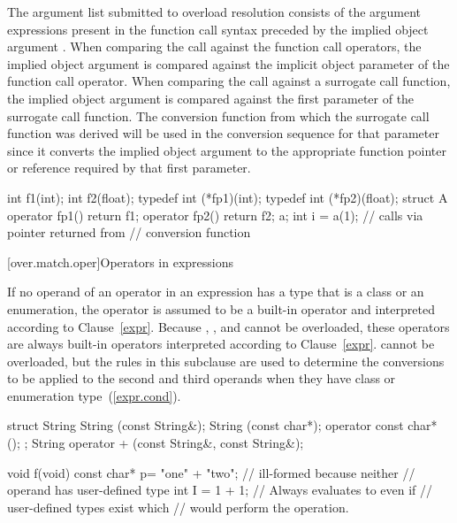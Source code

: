 \pnum
The argument list submitted to overload resolution consists of
the argument expressions present in the function call syntax
preceded by the implied object argument
.
\enternote
When comparing the
call against the function call operators, the implied object
argument is compared against the implicit object parameter of the
function call operator.
When comparing the call against a
surrogate call function, the implied object argument is compared
against the first parameter of the surrogate call function.
The
conversion function from which the surrogate call function was
derived will be used in the conversion sequence for that
parameter since it converts the implied object argument to the
appropriate function pointer or reference required by that first
parameter.
\exitnote
\enterexample

\begin{codeblock}
int f1(int);
int f2(float);
typedef int (*fp1)(int);
typedef int (*fp2)(float);
struct A {
  operator fp1() { return f1; }
  operator fp2() { return f2; }
} a;
int i = a(1);       // calls  via pointer returned from
                    // conversion function
\end{codeblock}
\exitexample%

[over.match.oper]{Operators in expressions}%

\pnum
If no operand of an operator in an expression has a type that is a class
or an enumeration, the operator is assumed to be a built-in operator
and interpreted according to Clause~\ref{expr}.
\enternote
Because
,
,
and
\tcode{::}
cannot be overloaded,
these operators are always built-in operators interpreted according to
Clause~\ref{expr}.
cannot be overloaded, but the rules in this subclause are used to determine
the conversions to be applied to the second and third operands when they
have class or enumeration type~(\ref{expr.cond}).
\exitnote
\enterexample

\begin{codeblock}
struct String {
  String (const String&);
  String (const char*);
  operator const char* ();
};
String operator + (const String&, const String&);

void f(void) {
 const char* p= "one" + "two";  // ill-formed because neither
                                // operand has user-defined type
 int I = 1 + 1;                 // Always evaluates to  even if
                                // user-defined types exist which
                                // would perform the operation.
}
\end{codeblock}
\exitexample

